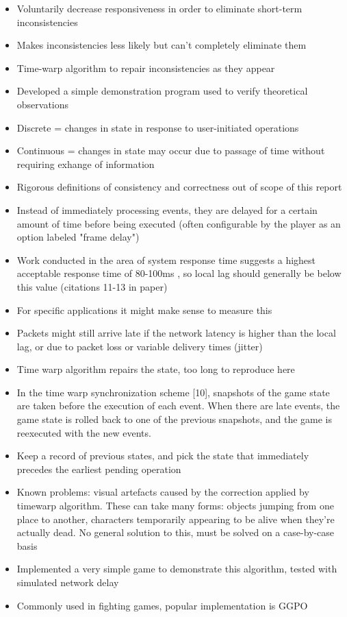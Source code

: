 \documentclass[conference]{IEEEtran}
\begin{document}
	\Textcite{mauve2004local}

	\begin{itemize}
		\item Voluntarily decrease responsiveness in order to eliminate short-term inconsistencies
		\item Makes inconsistencies less likely but can't completely eliminate them
		\item Time-warp algorithm to repair inconsistencies as they appear
		\item Developed a simple demonstration program used to verify theoretical observations
		\item Discrete = changes in state in response to user-initiated operations
		\item Continuous = changes in state may occur due to passage of time without requiring exhange of information
		\item Rigorous definitions of consistency and correctness out of scope of this report
		\item Instead of immediately processing events, they are delayed for a certain amount of time before being executed (often configurable by the player as an option labeled "frame delay")
		\item Work conducted in the area of system response time suggests a highest acceptable response time of 80-100ms \cite{teal1992performance} \cite{shneiderman1984response} \cite{card1983psychology}, so local lag should generally be below this value (citations 11-13 in paper)
		\item For specific applications it might make sense to measure this
		\item Packets might still arrive late if the network latency is higher than the local lag, or due to packet loss or variable delivery times (jitter)
		\item Time warp algorithm repairs the state, too long to reproduce here
		\item In the time warp synchronization scheme [10], snapshots of the game state are taken before the execution of each event. When there are late events, the game state is rolled back to one of the previous snapshots, and the game is reexecuted with the new events.
		\item Keep a record of previous states, and pick the state that immediately precedes the earliest pending operation
		\item Known problems: visual artefacts caused by the correction applied by timewarp algorithm. These can take many forms: objects jumping from one place to another, characters temporarily appearing to be alive when they're actually dead. No general solution to this, must be solved on a case-by-case basis
		\item Implemented a very simple game to demonstrate this algorithm, tested with simulated network delay
		\item Commonly used in fighting games, popular implementation is GGPO
	\end{itemize}
\end{document}

